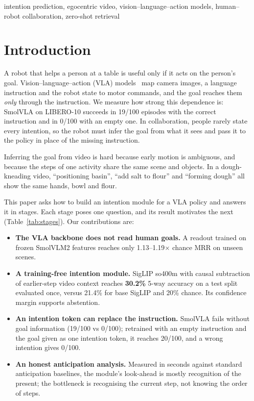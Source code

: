 \documentclass[conference,a4paper]{IEEEtran}
\begin{document}
\begin{IEEEkeywords}
intention prediction, egocentric video, vision--language--action models, human--robot collaboration, zero-shot retrieval
\end{IEEEkeywords}

\section{Introduction}

A robot that helps a person at a table is useful only if it acts on the person's goal. Vision--language--action (VLA) models~\cite{brohan2022rt1,zitkovich2023rt2,openx2024,shukor2025smolvla} map camera images, a language instruction and the robot state to motor commands, and the goal reaches them \emph{only} through the instruction. We measure how strong this dependence is: SmolVLA on LIBERO-10 succeeds in 19/100 episodes with the correct instruction and in 0/100 with an empty one. In collaboration, people rarely state every intention, so the robot must infer the goal from what it sees and pass it to the policy in place of the missing instruction.

Inferring the goal from video is hard because early motion is ambiguous, and because the steps of one activity share the same scene and objects. In a dough-kneading video, ``positioning basin'', ``add salt to flour'' and ``forming dough'' all show the same hands, bowl and flour.

This paper asks how to build an intention module for a VLA policy and answers it in stages. Each stage poses one question, and its result motivates the next (Table~\ref{tab:stages}). Our contributions are:
\begin{itemize}
\item \textbf{The VLA backbone does not read human goals.} A readout trained on frozen SmolVLM2 features reaches only 1.13--1.19$\times$ chance MRR on unseen scenes.
\item \textbf{A training-free intention module.} SigLIP so400m with causal subtraction of earlier-step video context reaches \textbf{30.2\%} 5-way accuracy on a test split evaluated once, versus 21.4\% for base SigLIP and 20\% chance. Its confidence margin supports abstention.
\item \textbf{An intention token can replace the instruction.} SmolVLA fails without goal information (19/100 vs 0/100); retrained with an empty instruction and the goal given as one intention token, it reaches 20/100, and a wrong intention gives 0/100.
\item \textbf{An honest anticipation analysis.} Measured in seconds against standard anticipation baselines, the module's look-ahead is mostly recognition of the present; the bottleneck is recognising the current step, not knowing the order of steps.
\end{itemize}
\end{document}

